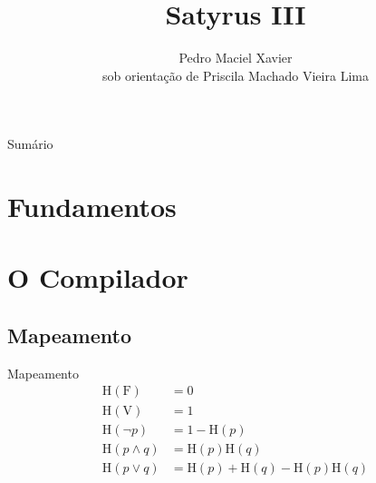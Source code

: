 \documentclass[brazil, MathSerif, aspectratio = 169]{beamer}
\author[Pedro Maciel]
{Pedro Maciel Xavier\\{\scriptsize sob orientação de Priscila Machado Vieira Lima}}
\title{Satyrus III}
\subtitle{\small }
\begin{document}
    \begin{frame}%
        {Sumário}
        \tableofcontents
    \end{frame}

    \hidelogo

    \section{Fundamentos}
    \SectionPage

    \subsection{}
    \begin{frame}{}
    \end{frame}

    \section{O Compilador}
    \SectionPage

    \subsection{Mapeamento}
    \newcommand{\HH}[1]{\text{H}\left(#1\right)}
    \begin{frame}{Mapeamento}
        \begin{align*}
            \HH{\text{F}} &= 0\\
            \HH{\text{V}} &= 1\\
            \HH{\neg p} &= 1 - \HH{p}\\
            \HH{p \wedge q} &= \HH{p} \HH{q}\\
            \HH{p \vee q} &= \HH{p} + \HH{q} - \HH{p} \HH{q}
        \end{align*}
    \end{frame}
\end{document}
